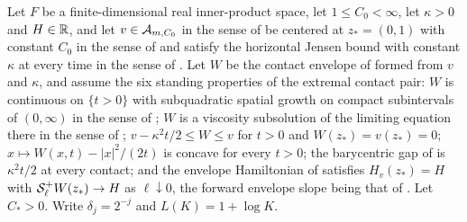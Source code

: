 \begin{lemma}
Let $F$ be a finite-dimensional real inner-product space, let
$1\le C_0<\infty$, let $\kappa>0$ and $H\in\mathbb{R}$, and let $v\in\mathcal{A}_{m,C_0}$
in the sense of  be centered at $z_*=(0,1)$ with constant
$C_0$ in the sense of  and satisfy the horizontal Jensen
bound with constant $\kappa$ at every time in the sense of
. Let $W$ be the contact envelope of
 formed from $v$ and $\kappa$, and assume the six standing
properties of the extremal contact pair: $W$ is continuous on $\{t>0\}$ with
subquadratic spatial growth on compact subintervals of $(0,\infty)$ in the sense
of ; $W$ is a viscosity subsolution of the limiting
equation there in the sense of ;
$v-\kappa^2t/2\le W\le v$ for $t>0$ and $W(z_*)=v(z_*)=0$;
$x\mapsto W(x,t)-|x|^2/(2t)$ is concave for every $t>0$; the barycentric gap of
 is $\kappa^2t/2$ at every contact; and the envelope
Hamiltonian of  satisfies $H_v(z_*)=H$ with
$\mathcal{S}_\ell^+W(z_*)\to H$ as $\ell\downarrow0$, the forward envelope slope being
that of . Let $C_*>0$. Write $\delta_j=2^{-j}$ and
$L(K)=1+\log K$.


\end{lemma}
